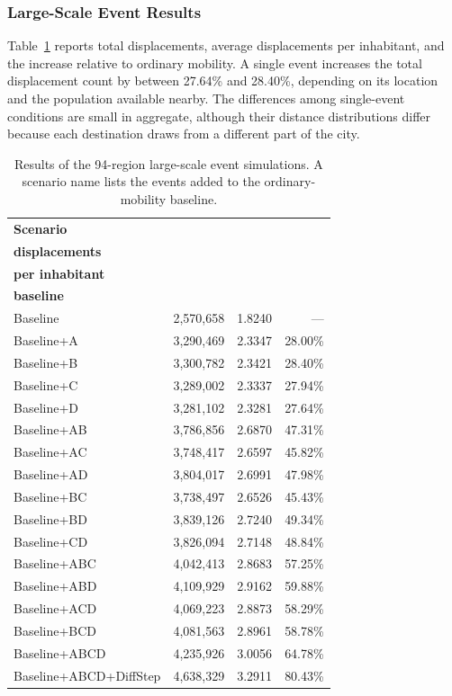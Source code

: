 \subsubsection{Large-Scale Event Results}

Table~\ref{tbl:large_scale_event_displacements_94} reports total displacements, average displacements per inhabitant, and the increase relative to ordinary mobility. A single event increases the total displacement count by between 27.64\% and 28.40\%, depending on its location and the population available nearby. The differences among single-event conditions are small in aggregate, although their distance distributions differ because each destination draws from a different part of the city.

\begin{table}[ht]
\footnotesize
\centering
\caption{Results of the 94-region large-scale event simulations. A scenario name lists the events added to the ordinary-mobility baseline.}
\label{tbl:large_scale_event_displacements_94}
\begin{tabular}{@{}lrrr@{}}
\toprule
\textbf{Scenario} & \shortstack{\textbf{Total}\\\textbf{displacements}} & \shortstack{\textbf{Displacements}\\\textbf{per inhabitant}} & \shortstack{\textbf{Increase over}\\\textbf{baseline}} \\
\midrule
Baseline               & 2,570,658 & 1.8240 & --- \\
\midrule
Baseline+A             & 3,290,469 & 2.3347 & 28.00\% \\
Baseline+B             & 3,300,782 & 2.3421 & 28.40\% \\
Baseline+C             & 3,289,002 & 2.3337 & 27.94\% \\
Baseline+D             & 3,281,102 & 2.3281 & 27.64\% \\
\midrule
Baseline+AB            & 3,786,856 & 2.6870 & 47.31\% \\
Baseline+AC            & 3,748,417 & 2.6597 & 45.82\% \\
Baseline+AD            & 3,804,017 & 2.6991 & 47.98\% \\
Baseline+BC            & 3,738,497 & 2.6526 & 45.43\% \\
Baseline+BD            & 3,839,126 & 2.7240 & 49.34\% \\
Baseline+CD            & 3,826,094 & 2.7148 & 48.84\% \\
\midrule
Baseline+ABC           & 4,042,413 & 2.8683 & 57.25\% \\
Baseline+ABD           & 4,109,929 & 2.9162 & 59.88\% \\
Baseline+ACD           & 4,069,223 & 2.8873 & 58.29\% \\
Baseline+BCD           & 4,081,563 & 2.8961 & 58.78\% \\
\midrule
Baseline+ABCD          & 4,235,926 & 3.0056 & 64.78\% \\
Baseline+ABCD+DiffStep & 4,638,329 & 3.2911 & 80.43\% \\
\bottomrule
\end{tabular}
\end{table}

